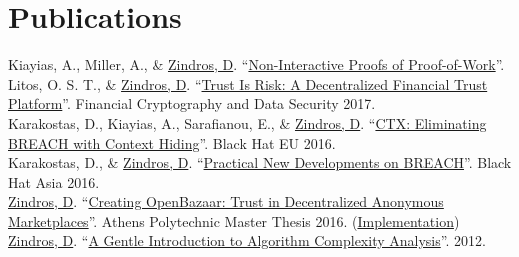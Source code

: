 \documentclass[]{deedy-resume-openfont}
\begin{document}
\hfill
\begin{minipage}[t]{0.66\textwidth}


\section{Publications}
Kiayias, A., Miller, A., \& \underline{Zindros, D}.
``\href{https://eprint.iacr.org/2017/963.pdf}{Non-Interactive Proofs of Proof-of-Work}''.\\
Litos, O. S. T., \& \underline{Zindros, D}.
``\href{https://eprint.iacr.org/2017/156.pdf}{Trust Is Risk: A Decentralized Financial Trust Platform}''.
Financial Cryptography and Data Security 2017.\\
Karakostas, D., Kiayias, A., Sarafianou, E., \& \underline{Zindros, D}.
``\href{https://www.blackhat.com/docs/eu-16/materials/eu-16-Karakostas-Ctx-Eliminating-BREACH-With-Context-Hiding.pdf}{CTX: Eliminating BREACH with Context Hiding}''. Black Hat EU 2016.\\
Karakostas, D., \& \underline{Zindros, D}.
``\href{https://www.youtube.com/watch?v=T4iTwNLPv4g&list=PLH15HpR5qRsWLd417eaJNy7CCEDyA53Pz&index=5}{Practical New Developments on BREACH}''. Black Hat Asia 2016.\\
\underline{Zindros, D}.
``\href{https://dionyziz.com/pseudonymous-trust-2.pdf}{Creating OpenBazaar: Trust in Decentralized Anonymous Marketplaces}''.
Athens Polytechnic Master Thesis 2016.
(\href{https://github.com/OpenBazaar/OpenBazaar-Server}{Implementation})\\
\underline{Zindros, D}.
``\href{http://discrete.gr/complexity}
{A Gentle Introduction to Algorithm Complexity Analysis}''.
2012.
\sectionsep


\end{minipage}
\end{document}
